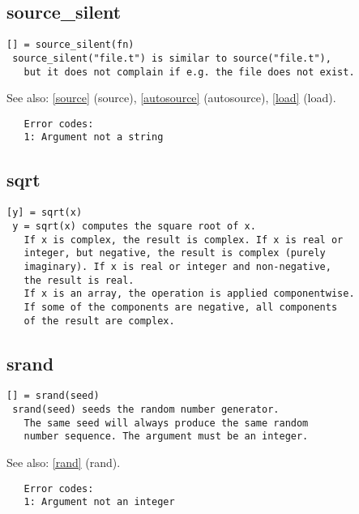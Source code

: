 \documentclass[a4paper]{article}
\begin{document}
\subsection{source\_silent\label{source_silent}}

\begin{tscreen}
\begin{verbatim}
[] = source_silent(fn)
 source_silent("file.t") is similar to source("file.t"),
   but it does not complain if e.g. the file does not exist.
\end{verbatim}

See also: \ref{source} {(source)}, \ref{autosource} {(autosource)}, \ref{load} {(load)}.
\begin{verbatim}
   Error codes:
   1: Argument not a string 
\end{verbatim}
\end{tscreen}



\subsection{sqrt\label{sqrt}}

\begin{tscreen}
\begin{verbatim}
[y] = sqrt(x)
 y = sqrt(x) computes the square root of x.
   If x is complex, the result is complex. If x is real or
   integer, but negative, the result is complex (purely
   imaginary). If x is real or integer and non-negative,
   the result is real.
   If x is an array, the operation is applied componentwise.
   If some of the components are negative, all components
   of the result are complex.
\end{verbatim}
\end{tscreen}



\subsection{srand\label{srand}}

\begin{tscreen}
\begin{verbatim}
[] = srand(seed)
 srand(seed) seeds the random number generator.
   The same seed will always produce the same random
   number sequence. The argument must be an integer.
\end{verbatim}

See also: \ref{rand} {(rand)}.
\begin{verbatim}
   Error codes:
   1: Argument not an integer 
\end{verbatim}
\end{tscreen}
\end{document}
